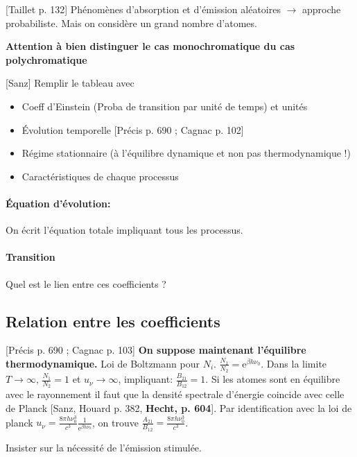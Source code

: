 \documentclass[11pt]{report}
\numberwithin{figure}{section}
\numberwithin{equation}{section}
\numberwithin{table}{section}
\newcommand{\e}{\mathrm{e}}
\newcommand{\1}{\boldsymbol{1}}
\begin{document}
[Taillet p. 132] 
Phénomènes d'absorption et d'émission aléatoires $\rightarrow$ approche probabiliste. Mais on considère un grand nombre d'atomes.

\textbf{Attention à bien distinguer le cas monochromatique du cas polychromatique}

[Sanz]
Remplir le tableau avec
\begin{itemize}
\item Coeff d'Einstein (Proba de transition par unité de temps) et unités
\item Évolution temporelle [Précis p. 690 ; Cagnac p. 102]
\item Régime stationnaire (à l'équilibre dynamique et non pas thermodynamique !)
\item Caractéristiques de chaque processus
\end{itemize}

\paragraph{Équation d'évolution:} On écrit l'équation totale impliquant tous les processus.

\paragraph{Transition} Quel est le lien entre ces coefficients ?

\subsection{Relation entre les coefficients}

[Précis p. 690 ; Cagnac p. 103] \textbf{On suppose maintenant l'équilibre thermodynamique.} Loi de Boltzmann pour $N_i$. $\frac{N_1}{N_2} = \e^{\beta h \nu_0}$. Dans la limite $T \rightarrow \infty$, $\frac{N_1}{N_2} = 1$ et $u_\nu \rightarrow \infty$, impliquant: $\frac{B_{21}}{B_{12}} = 1$. Si les atomes sont en équilibre avec le rayonnement il faut que la densité spectrale d’énergie coincide avec celle de Planck [Sanz, Houard p. 382, \textbf{Hecht, p. 604}]. Par identification avec la loi de planck  $u_\nu = \frac{8 \pi h \nu_0^3}{c^3} \frac{1}{\e^{\beta h \nu_0}}$, on trouve $\frac{A_{21}}{B_{12}} = \frac{8 \pi h \nu_0^3}{c^3}$.


Insister sur la nécessité de l'émission stimulée.
\end{document}
